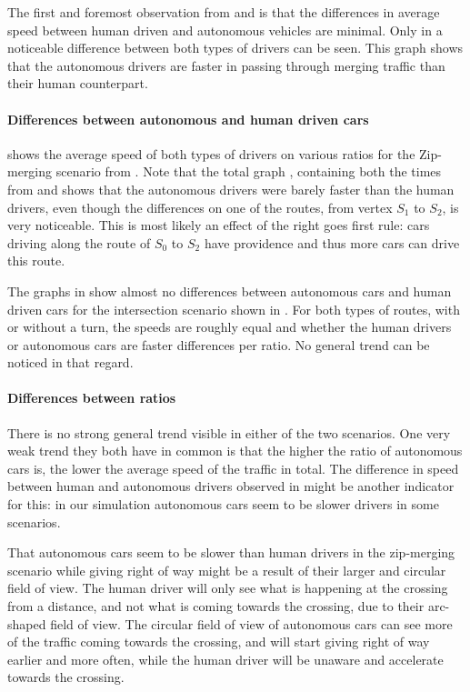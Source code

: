 The first and foremost observation from  and  is that the differences in average speed between human driven and autonomous vehicles are minimal. Only in  a noticeable difference between both types of drivers can be seen. This graph shows that the autonomous drivers are faster in passing through merging traffic than their human counterpart.

\paragraph{Differences between autonomous and human driven cars}
 shows the average speed of both types of drivers on various ratios for the Zip-merging scenario from . Note that the total graph , containing both the times from  and  shows that the autonomous drivers were barely faster than the human drivers, even though the differences on one of the routes, from vertex $S_1$ to $S_2$, is very noticeable. This is most likely an effect of the right goes first rule: cars driving along the route of $S_0$ to $S_2$ have providence and thus more cars can drive this route.

The graphs in  show almost no differences between autonomous cars and human driven cars for the intersection scenario shown in . For both types of routes, with or without a turn, the speeds are roughly equal and whether the human drivers or autonomous cars are faster differences per ratio. No general trend can be noticed in that regard.

\paragraph{Differences between ratios}
There is no strong general trend visible in either of the two scenarios. One very weak trend they both have in common is that the higher the ratio of autonomous cars is, the lower the average speed of the traffic in total. The difference in speed between human and autonomous drivers observed in  might be another indicator for this: in our simulation autonomous cars seem to be slower drivers in some scenarios.

That autonomous cars seem to be slower than human drivers in the zip-merging scenario while giving right of way might be a result of their larger and circular field of view. The human driver will only see what is happening at the crossing from a distance, and not what is coming towards the crossing, due to their arc-shaped field of view. The circular field of view of autonomous cars can see more of the traffic coming towards the crossing, and will start giving right of way earlier and more often, while the human driver will be unaware and accelerate towards the crossing.